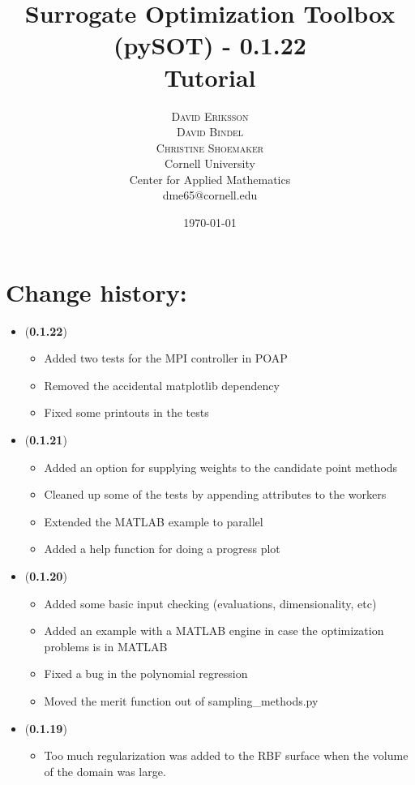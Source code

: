 \documentclass[]{article}
\title{\vspace{-15mm}%
	\fontsize{18pt}{10pt}\selectfont
	\textbf{Surrogate Optimization Toolbox (pySOT) - 0.1.22 \\ Tutorial}
	}
\author{%
	\Large\textsc{David Eriksson} \\[2mm]
	\Large\textsc{David Bindel} \\[2mm]
	\Large\textsc{Christine Shoemaker} \\[2mm]
		\normalsize	Cornell University \\
	\normalsize Center for Applied Mathematics \\
	\normalsize	dme65@cornell.edu \\ 
	}
\date{\today}
\begin{document}
\fontsize{12}{14}\rm

\maketitle
\thispagestyle{fancy}
\tableofcontents
\newpage

\section{Change history:}
\begin{itemize}

	\item (\textbf{0.1.22})
	\begin{itemize}
		\item Added two tests for the MPI controller in POAP
		\item Removed the accidental matplotlib dependency
		\item Fixed some printouts in the tests
	\end{itemize}

	\item (\textbf{0.1.21})
	\begin{itemize}
		\item 	Added an option for supplying weights to the candidate point methods
		\item Cleaned up some of the tests by appending attributes to the workers
		\item Extended the MATLAB example to parallel
		\item Added a help function for doing a progress plot
	\end{itemize}

	\item (\textbf{0.1.20})
	\begin{itemize}
		\item Added some basic input checking (evaluations, dimensionality, etc)
		\item Added an example with a MATLAB engine in case the optimization problems is in MATLAB
		\item Fixed a bug in the polynomial regression
		\item Moved the merit function out of sampling\_methods.py
	\end{itemize}

	\item (\textbf{0.1.19})
	\begin{itemize}
		\item 	Too much regularization was added to the RBF surface when the volume of the domain was large.
	\end{itemize}


\end{itemize}
\end{document}
